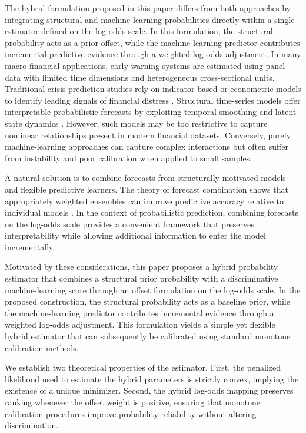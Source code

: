 \documentclass[a4paper,fleqn]{cas-dc}
\begin{document}
	The hybrid formulation proposed in this paper differs from both approaches by
	integrating structural and machine-learning probabilities directly within a
	single estimator defined on the log-odds scale. In this formulation, the
	structural probability acts as a prior offset, while the machine-learning
	predictor contributes incremental predictive evidence through a weighted
	log-odds adjustment.
	In many macro-financial applications, early-warning systems are estimated using panel data with limited time dimensions and heterogeneous cross-sectional units. Traditional crisis-prediction studies rely on indicator-based or econometric models to identify leading signals of financial distress \citep{Kaminsky1998leading,Demirguc1998determinants,BussiereFratzscher2006}. Structural time-series models offer interpretable probabilistic forecasts by exploiting temporal smoothing and latent state dynamics \citep{Harvey1990,DurbinKoopman2012}. However, such models may be too restrictive to capture nonlinear relationships present in modern financial datasets. Conversely, purely machine-learning approaches can capture complex interactions but often suffer from instability and poor calibration when applied to small samples.
	
	A natural solution is to combine forecasts from structurally motivated models and flexible predictive learners. The theory of forecast combination shows that appropriately weighted ensembles can improve predictive accuracy relative to individual models \citep{BatesGranger1969,Clemen1989}. In the context of probabilistic prediction, combining forecasts on the log-odds scale provides a convenient framework that preserves interpretability while allowing additional information to enter the model incrementally.
	
	Motivated by these considerations, this paper proposes a hybrid probability estimator that combines a structural prior probability with a discriminative machine-learning score through an offset formulation on the log-odds scale. In the proposed construction, the structural probability acts as a baseline prior, while the machine-learning predictor contributes incremental evidence through a weighted log-odds adjustment. This formulation yields a simple yet flexible hybrid estimator that can subsequently be calibrated using standard monotone calibration methods.
	
	We establish two theoretical properties of the estimator. First, the penalized likelihood used to estimate the hybrid parameters is strictly convex, implying the existence of a unique minimizer. Second, the hybrid log-odds mapping preserves ranking whenever the offset weight is positive, ensuring that monotone calibration procedures improve probability reliability without altering discrimination.
	
\end{document}
